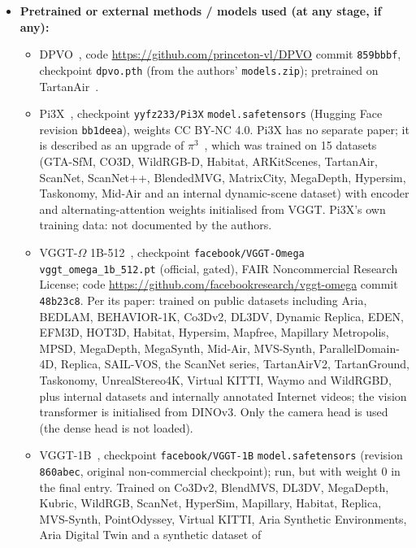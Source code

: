 \documentclass[11pt]{article}
\begin{document}
\begin{itemize}
  \item \textbf{Pretrained or external methods / models used (at any stage, if any):}
    \begin{itemize}[nosep]
      \item DPVO~\cite{teed2023deep}, code \url{https://github.com/princeton-vl/DPVO} commit \texttt{859bbbf}, checkpoint
        \texttt{dpvo.pth} (from the authors' \texttt{models.zip}); pretrained on TartanAir~\cite{wang2020tartanair}.
      \item Pi3X~\cite{pi3x2025}, checkpoint \texttt{yyfz233/Pi3X} \texttt{model.safetensors} (Hugging Face revision
        \texttt{bb1deea}), weights CC BY-NC 4.0. Pi3X has no separate paper; it is described as an upgrade of
        $\pi^3$~\cite{wang2025pi3}, which was trained on 15 datasets (GTA-SfM, CO3D, WildRGB-D, Habitat, ARKitScenes,
        TartanAir, ScanNet, ScanNet++, BlendedMVG, MatrixCity, MegaDepth, Hypersim, Taskonomy, Mid-Air and an
        internal dynamic-scene dataset) with encoder and alternating-attention weights initialised from VGGT.
        Pi3X's own training data: not documented by the authors.
      \item VGGT-$\Omega$ 1B-512~\cite{wang2026vggtomega}, checkpoint \texttt{facebook/VGGT-Omega}
        \texttt{vggt\_omega\_1b\_512.pt} (official, gated), FAIR Noncommercial Research License; code
        \url{https://github.com/facebookresearch/vggt-omega} commit \texttt{48b23c8}. Per its paper: trained on public
        datasets including Aria, BEDLAM, BEHAVIOR-1K, Co3Dv2, DL3DV, Dynamic Replica, EDEN, EFM3D, HOT3D, Habitat,
        Hypersim, Mapfree, Mapillary Metropolis, MPSD, MegaDepth, MegaSynth, Mid-Air, MVS-Synth, ParallelDomain-4D,
        Replica, SAIL-VOS, the ScanNet series, TartanAirV2, TartanGround, Taskonomy, UnrealStereo4K, Virtual KITTI,
        Waymo and WildRGBD, plus internal datasets and internally annotated Internet videos; the vision transformer
        is initialised from DINOv3. Only the camera head is used (the dense head is not loaded).
      \item VGGT-1B~\cite{wang2025vggt}, checkpoint \texttt{facebook/VGGT-1B} \texttt{model.safetensors} (revision
        \texttt{860abec}, original non-commercial checkpoint); run, but with weight 0 in the final entry. Trained on
        Co3Dv2, BlendMVS, DL3DV, MegaDepth, Kubric, WildRGB, ScanNet, HyperSim, Mapillary, Habitat, Replica, MVS-Synth,
        PointOdyssey, Virtual KITTI, Aria Synthetic Environments, Aria Digital Twin and a synthetic dataset of

\end{itemize}
\end{itemize}
\end{document}

